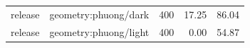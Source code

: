 \begin{longtable}{l>{\raggedright\arraybackslash}p{.42\linewidth}rrr}
release & %
geometry:phuong/dark & %
400 & %
17.25 & %
86.04 \\ %

release & %
geometry:phuong/light & %
400 & %
0.00 & %
54.87 \\ %


\end{longtable}
